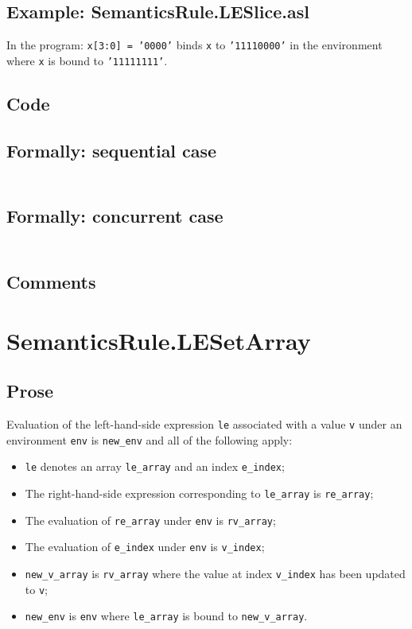 \documentclass{book}
\begin{document}
   \subsection{Example: SemanticsRule.LESlice.asl}
   In the program:
   \texttt{x[3:0] = '0000'} binds \texttt{x} to \texttt{'11110000'} in the environment where \texttt{x} is bound to \texttt{'11111111'}.

  \subsection{Code}

  \subsection{Formally: sequential case}
  \begin{align}
  \end{align} 

  \subsection{Formally: concurrent case}
  \begin{align}
  \end{align} 

   \subsection{Comments}

\section{SemanticsRule.LESetArray \label{sec:SemanticsRule.LESetArray}}

    \subsection{Prose}
    Evaluation of the left-hand-side expression \texttt{le} associated with a
value \texttt{v} under an environment \texttt{env} is \texttt{new\_env} and all
of the following apply:
    \begin{itemize}
    \item \texttt{le} denotes an array \texttt{le\_array} and an index \texttt{e\_index};
    \item The right-hand-side expression corresponding to \texttt{le\_array} is \texttt{re\_array};
    \item The evaluation of \texttt{re\_array} under \texttt{env} is \texttt{rv\_array};
    \item The evaluation of \texttt{e\_index} under \texttt{env} is \texttt{v\_index};
    \item \texttt{new\_v\_array} is \texttt{rv\_array} where the value at index \texttt{v\_index} has been
      updated to \texttt{v};
    \item \texttt{new\_env} is \texttt{env} where \texttt{le\_array} is bound to
      \texttt{new\_v\_array}.
    \end{itemize}
\end{document}
